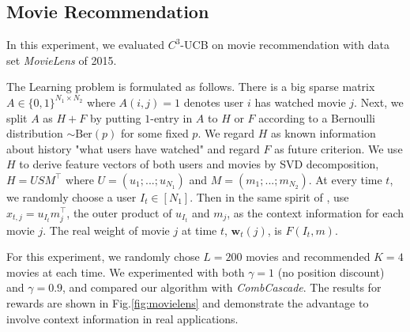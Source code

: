 \documentclass{article}
\newcommand{\bw}{\mathbf{w}}
\begin{document}
\subsection{Movie Recommendation}

In this experiment, we evaluated $C^3$-UCB on movie recommendation with data set {\it MovieLens} \cite{lam2013movie} of 2015.

The Learning problem is formulated as follows. There is a big sparse matrix $A \in \{0,1\}^{N_1 \times N_2}$ where $A(i,j) = 1$ denotes user $i$ has watched movie $j$. Next, we split $A$ as $H + F$ by putting $1$-entry in $A$ to $H$ or $F$ according to a Bernoulli distribution $\sim \mathrm{Ber}(p)$ for some fixed $p$. We regard $H$ as known information about history "what users have watched" and regard $F$ as future criterion. We use $H$ to derive feature vectors of both users and movies by SVD decomposition, $H = USM^{\top}$ where $U = (u_1; ...;u_{N_1})$ and $M = (m_1;...;m_{N_2})$. At every time $t$, we randomly choose a user $I_t \in [N_1]$. Then in the same spirit of \cite{li2010contextual}, use $x_{t,j} = u_{I_t}m_j^{\top}$, the outer product of $u_{I_t}$ and $m_{j}$, as the context information for each movie $j$. The real weight of movie $j$ at time $t$, $\bw_t(j)$, is $F(I_t,m)$.

For this experiment, we randomly chose $L=200$ movies and recommended $K=4$ movies at each time. We experimented with both $\gamma=1$ (no position discount) and $\gamma=0.9$, and compared our algorithm with {\it CombCascade}. The results for rewards are shown in Fig.\ref{fig:movielens} and demonstrate the advantage to involve context information in real applications.
\end{document}
